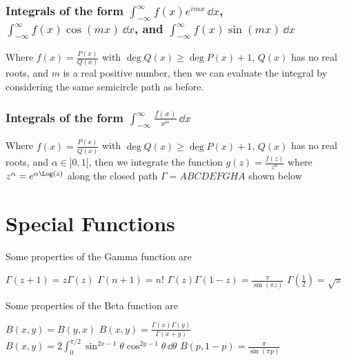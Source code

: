 \documentclass{report}
\begin{document}
\subsubsection{Integrals of the form $\int_{-\infty}^\infty f(x)e^{imx}\,\dd{x}$, $\int_{-\infty}^\infty f(x)\cos(mx)\,\dd{x}$, and $\int_{-\infty}^\infty f(x)\sin(mx)\,\dd{x}$}

Where $f(x) = \frac{P(x)}{Q(x)}$ with $\deg Q(x) \geq \deg P(x) + 1$, $Q(x)$ has no real roots, and $m$ is a real positive number, then we can evaluate the integral by considering the same semicircle path as before.

\subsubsection{Integrals of the form $\int_{-\infty}^\infty \frac{f(x)}{x^\alpha}\,\dd{x}$}

Where $f(x) = \frac{P(x)}{Q(x)}$ with $\deg Q(x) \geq \deg P(x) + 1$, $Q(x)$ has no real roots, and $\alpha\in]0,1[$, then we integrate the function $g(z)=\frac{f(z)}{z^\alpha}$ where $z^\alpha=e^{\alpha\Log(z)}$ along the closed path $\Gamma = ABCDEFGHA$ shown below


\section{Special Functions}


Some properties of the Gamma function are
\begin{enumerate}
	\ii $\Gamma(z+1) = z\Gamma(z)$
	\ii $\Gamma(n+1) = n!$
	\ii $\Gamma(z)\Gamma(1-z) = \frac{\pi}{\sin(\pi z)}$
	\ii $\Gamma(\frac{1}{2}) = \sqrt{\pi}$
\end{enumerate}


Some properties of the Beta function are
\begin{enumerate}
	\ii $B(x,y) = B(y,x)$
	\ii $B(x,y) = \frac{\Gamma(x)\Gamma(y)}{\Gamma(x+y)}$
	\ii $B(x,y) = 2\int_0^{\pi/2} \sin^{2x-1}\theta\cos^{2y-1}\theta\,\dd{\theta}$
	\ii $B(p,1-p) = \frac{\pi}{\sin(\pi p)}$
\end{enumerate}
\end{document}
